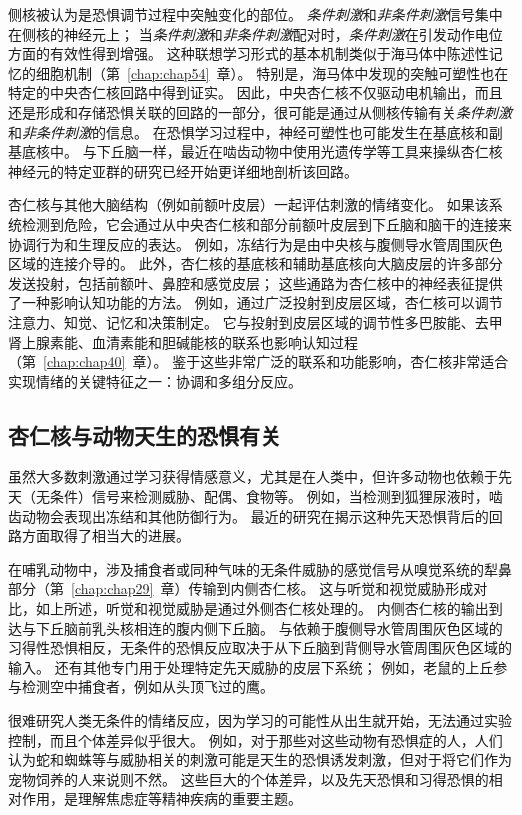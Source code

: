 侧核被认为是恐惧调节过程中突触变化的部位。
\textit{条件刺激}和\textit{非条件刺激}信号集中在侧核的神经元上；
当\textit{条件刺激}和\textit{非条件刺激}配对时，\textit{条件刺激}在引发动作电位方面的有效性得到增强。
这种联想学习形式的基本机制类似于海马体中陈述性记忆的细胞机制（第~\ref{chap:chap54}~章）。
特别是，海马体中发现的突触可塑性也在特定的中央杏仁核回路中得到证实。
因此，中央杏仁核不仅驱动电机输出，而且还是形成和存储恐惧关联的回路的一部分，很可能是通过从侧核传输有关\textit{条件刺激}和\textit{非条件刺激}的信息。
在恐惧学习过程中，神经可塑性也可能发生在基底核和副基底核中。
与下丘脑一样，最近在啮齿动物中使用光遗传学等工具来操纵杏仁核神经元的特定亚群的研究已经开始更详细地剖析该回路。


杏仁核与其他大脑结构（例如前额叶皮层）一起评估刺激的情绪变化。
如果该系统检测到危险，它会通过从中央杏仁核和部分前额叶皮层到下丘脑和脑干的连接来协调行为和生理反应的表达。
例如，冻结行为是由中央核与腹侧导水管周围灰色区域的连接介导的。
此外，杏仁核的基底核和辅助基底核向大脑皮层的许多部分发送投射，包括前额叶、鼻腔和感觉皮层；
这些通路为杏仁核中的神经表征提供了一种影响认知功能的方法。
例如，通过广泛投射到皮层区域，杏仁核可以调节注意力、知觉、记忆和决策制定。
它与投射到皮层区域的调节性多巴胺能、去甲肾上腺素能、血清素能和胆碱能核的联系也影响认知过程（第~\ref{chap:chap40}~章）。
鉴于这些非常广泛的联系和功能影响，杏仁核非常适合实现情绪的关键特征之一：协调和多组分反应。



\subsection{杏仁核与动物天生的恐惧有关}

虽然大多数刺激通过学习获得情感意义，尤其是在人类中，但许多动物也依赖于先天（无条件）信号来检测威胁、配偶、食物等。
例如，当检测到狐狸尿液时，啮齿动物会表现出冻结和其他防御行为。
最近的研究在揭示这种先天恐惧背后的回路方面取得了相当大的进展。


在哺乳动物中，涉及捕食者或同种气味的无条件威胁的感觉信号从嗅觉系统的犁鼻部分（第~\ref{chap:chap29}~章）传输到内侧杏仁核。
这与听觉和视觉威胁形成对比，如上所述，听觉和视觉威胁是通过外侧杏仁核处理的。
内侧杏仁核的输出到达与下丘脑前乳头核相连的腹内侧下丘脑。
与依赖于腹侧导水管周围灰色区域的习得性恐惧相反，无条件的恐惧反应取决于从下丘脑到背侧导水管周围灰色区域的输入。
还有其他专门用于处理特定先天威胁的皮层下系统；
例如，老鼠的上丘参与检测空中捕食者，例如从头顶飞过的鹰。


很难研究人类无条件的情绪反应，因为学习的可能性从出生就开始，无法通过实验控制，而且个体差异似乎很大。
例如，对于那些对这些动物有恐惧症的人，人们认为蛇和蜘蛛等与威胁相关的刺激可能是天生的恐惧诱发刺激，但对于将它们作为宠物饲养的人来说则不然。
这些巨大的个体差异，以及先天恐惧和习得恐惧的相对作用，是理解焦虑症等精神疾病的重要主题。




